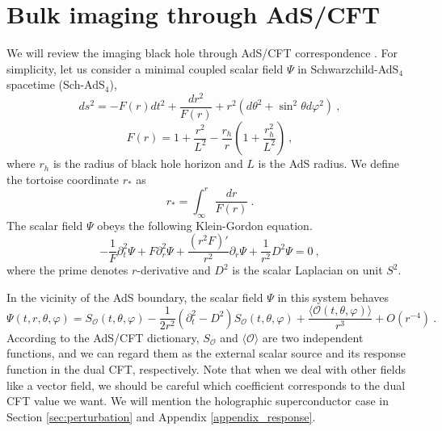 \documentclass[a4paper,11pt]{article}
\begin{document}
\section{Bulk imaging through AdS/CFT}
\label{sec:Review}

    We will review the imaging black hole through AdS/CFT correspondence \cite{Hashimoto:2018okj, Hashimoto:2019jmw}. For simplicity, let us consider a minimal coupled scalar field $\Psi$ in Schwarzchild-AdS$_4$ spacetime (Sch-AdS$_4$), 
    \begin{equation} \label{eq:SAdS metric}
        ds^2 = -F(r)dt^2 + \frac{dr^2}{F(r)} + r^2 (d\theta^2 + \sin^2\theta d\varphi^2)\ ,
    \end{equation}
    \begin{equation} \label{eq:Lapse function}
        F(r) = 1 + \frac{r^2}{L^2} - \dfrac{r_h}{r}\left( 1 + \frac{r_h^2}{L^2} \right)\ ,
    \end{equation}
    where $r_h$ is the radius of black hole horizon and $L$ is the AdS radius.
    We define the tortoise coordinate $r_*$ as
    \begin{equation}
        r_*=\int_\infty^r \frac{dr}{F(r)}\ .
    \end{equation}
    The scalar field $\Psi$ obeys the following Klein-Gordon equation.
    \begin{equation} 
        -\frac{1}{F} \partial_t^2 \Psi + F \partial_r^2 \Psi + \frac{(r^2 F)'}{r^2} \partial_r \Psi + \frac{1}{r^2} D^2\Psi = 0\ ,
    \end{equation}
    where the prime denotes $r$-derivative and $D^2$ is the scalar Laplacian on unit $S^2$.

    In the vicinity of the AdS boundary, the scalar field $\Psi$ in this system  behaves 
    \begin{equation} \label{eq:Klein Gordon}
        \Psi(t,r,\theta,\varphi) = S_{\mathcal{O}}(t,\theta,\varphi) -\frac{1}{2r^2}(\partial^2_t-D^2)S_{\mathcal{O}}(t,\theta,\varphi) + \frac{\langle \mathcal{O}(t,\theta,\varphi) \rangle}{r^3} + O(r^{-4})\ .
    \end{equation}
    According to the AdS/CFT dictionary, $S_{\mathcal{O}}$ and $\langle \mathcal{O}\rangle$ are two independent functions, and we can regard them as the external scalar source and its response function in the dual CFT, respectively. Note that when we deal with other fields like a vector field, we should be careful which coefficient corresponds to the dual CFT value we want. We will mention  the holographic superconductor case in Section \ref{sec:perturbation} and Appendix \ref{appendix_response}. 
\end{document}
